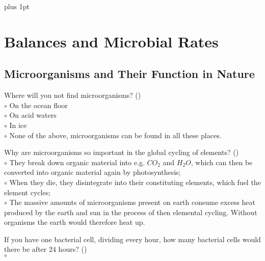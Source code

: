 \documentclass[]{beamer}
\begin{document}
\parskip=1cm plus 1pt
\section{Balances and Microbial Rates}

\subsection{Microorganisms and Their Function in Nature}
\setcounter{questions}{0}
\begin{frame}[shrink] {}
\addtocounter{questions}{1}
\color{blue}
Where will you not find microorganisms? ()\\
\color{black}
\setlength{\parindent}{-0.4cm}
{\color{red}$\circ$} On the ocean floor \\
{\color{red}$\circ$} On acid waters  \\
{\color{red}$\circ$} In ice  \\
{\color{red}$\circ$} None of the above, microorganisms can be found in all these places. \\
\end{frame}

\begin{frame}[shrink] {}
\addtocounter{questions}{1}
\color{blue}
Why are microorganisms so important in the global cycling of elements? ()\\
\color{black}
\setlength{\parindent}{-0.4cm}
{\color{red}$\circ$} They break down organic material into e.g. $CO_2$ and $H_2O$, which can
then be converted into organic material again by photosynthesis;\\
{\color{red}$\circ$} When they die, they disintegrate into their constituting elements,
which fuel the element cycles;\\
{\color{red}$\circ$} The massive amounts of microorganisms present on earth
consume excess heat produced by the earth and sun in the process of
then elemental cycling. Without organisms the earth would therefore heat up.
\end{frame}

\begin{frame}[shrink] {}
\addtocounter{questions}{1}
\color{blue}
If you have one bacterial cell, dividing every hour, how many bacterial
cells would there be after 24 hours? ()\\
\color{black}
\setlength{\parindent}{-0.4cm}
{\color{red}$\circ$}\\ 
\end{frame}
\end{document}

